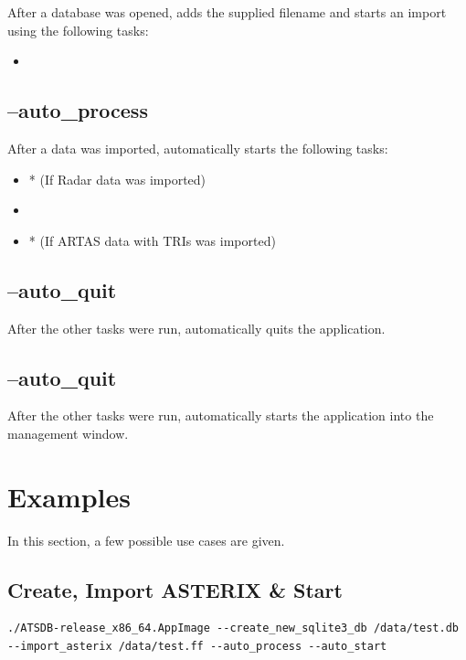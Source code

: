 After a database was opened, adds the supplied filename and starts an import using the following tasks:

\begin{itemize}
 \item {}
\end{itemize}

\subsection{--auto\_process}

After a data was imported, automatically starts the following tasks:

\begin{itemize}
 \item {}* (If Radar data was imported)
 \item {}
 \item {}* (If ARTAS data with TRIs was imported)
\end{itemize}

\subsection{--auto\_quit}

After the other tasks were run, automatically quits the application.

\subsection{--auto\_quit}

After the other tasks were run, automatically starts the application into the management window.


\section{Examples}

In this section, a few possible use cases are given.

\subsection{Create, Import ASTERIX \& Start}

\begin{lstlisting}
./ATSDB-release_x86_64.AppImage --create_new_sqlite3_db /data/test.db --import_asterix /data/test.ff --auto_process --auto_start
\end{lstlisting}
\ \\
